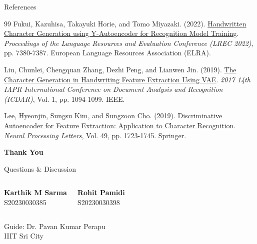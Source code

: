 \documentclass[aspectratio=169, 12pt]{beamer}
\begin{document}
\begin{frame}[allowframebreaks]{References}
\begin{thebibliography}{99}
        Fukui, Kazuhisa, Takayuki Horie, and Tomo Miyazaki. (2022).
        \newblock \href{https://aclanthology.org/2022.lrec-1.799/}{Handwritten Character Generation using Y-Autoencoder for Recognition Model Training}.
        \newblock \textit{Proceedings of the Language Resources and Evaluation Conference (LREC 2022)}, pp. 7380-7387. European Language Resources Association (ELRA).
        
        Liu, Chunlei, Chengquan Zhang, Dezhi Peng, and Lianwen Jin. (2019).
        \newblock \href{https://ieeexplore.ieee.org/document/8270100}{The Character Generation in Handwriting Feature Extraction Using VAE}.
        \newblock \textit{2017 14th IAPR International Conference on Document Analysis and Recognition (ICDAR)}, Vol. 1, pp. 1094-1099. IEEE.
        
        Lee, Hyeonjin, Sungsu Kim, and Sungzoon Cho. (2019).
        \newblock \href{https://link.springer.com/article/10.1007/s11063-018-9894-5}{Discriminative Autoencoder for Feature Extraction: Application to Character Recognition}.
        \newblock \textit{Neural Processing Letters}, Vol. 49, pp. 1723-1745. Springer.
        
    \end{thebibliography}
\end{frame}

\begin{frame}
    \vfill
    \centering
    {\Huge \textbf{Thank You}}
    
    \vspace{1cm}
    {\large Questions \& Discussion}
    
    \vspace{1.5cm}
    \begin{columns}
        \centering
        \textbf{Karthik M Sarma} \\
        S20230030385
        
        \centering
        \textbf{Rohit Pamidi} \\
        S20230030398
    \end{columns}
    
    \vspace{0.5cm}
    \small
    Guide: Dr. Pavan Kumar Perapu \\
    IIIT Sri City
    \vfill
\end{frame}
\end{document}
